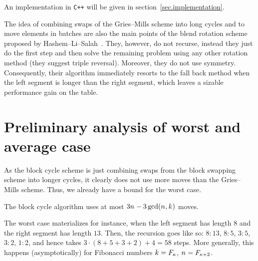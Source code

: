   An implementation in \verb-C++- will be given in
  section~\ref{sec.implementation}.
  \begin{remark}
    The idea of combining swaps of the Gries--Mills scheme into long
    cycles and to move elements in batches are also the main points of the
    blend rotation scheme proposed by
    Hashem--Li--Salah~\cite[Algorithm~3]{HashemLiSalah23}.  They, however,
    do not recurse, instead they just do the first step and then solve the
    remaining problem using any other rotation method (they suggest triple
    reversal).  %
    Moreover, they do not use symmetry. Consequently, their algorithm
    immediately resorts to the fall back method when the left segment is
    longer than the right segment, which leaves a sizable
    performance gain on the table. %
  \end{remark}

  \section{Preliminary analysis of worst and average case}\label{sec.linear-term}
  As the block cycle scheme is just combining swaps from the block
  swapping scheme into longer cycles, it clearly does not use more moves
  than the Gries--Mills scheme. Thus, we already have a bound for the
  worst case.
  \begin{observation}
    The block cycle algorithm uses at most $3n_{} - 3\gcd(n_{},k_{})$ moves. %
  \end{observation}
  \begin{observation}\label{fib-worst}
    The worst case materializes for instance, when the left segment
    has length $8$ and the right segment has length $13$.  Then, the
    recursion goes like so: $8:13$, $8:5$, $3:5$, $3:2$, $1:2$,
    and hence takes $3\cdot(8+5+3+2) + 4 = 58$ steps.
    More generally, this happens (asymptotically) for Fibonacci
    numbers $k_{} = F_{\kappa}$, $n_{} = F_{\kappa+2}$. %
  \end{observation}

